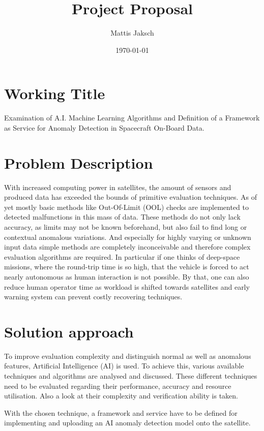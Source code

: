 \documentclass[10pt,a4paper]{scrartcl}
\title{Project Proposal}
\author{Mattis Jaksch}
\date{\today}
\begin{document}
\maketitle

\flushleft

\section*{Working Title}
Examination of A.I. Machine Learning Algorithms and Definition of a Framework as Service for Anomaly Detection in Spacecraft On-Board Data.


\section*{Problem Description}
With increased computing power in satellites, the amount of sensors and produced data has exceeded the bounds of primitive evaluation techniques. As of yet mostly basic methods like Out-Of-Limit (OOL) checks are implemented to detected malfunctions in this mass of data. These methods do not only lack accuracy, as limits may not be known beforehand, but also fail to find long or contextual anomalous variations. And especially for highly varying or unknown input data simple methods are completely inconceivable and therefore complex evaluation algorithms are required. 
In particular if one thinks of deep-space missions, where the round-trip time is so high, that the vehicle is forced to act nearly autonomous as human interaction is not possible. By that, one can also reduce human operator time as workload is shifted towards satellites and early warning system can prevent costly recovering techniques.

\section*{Solution approach}
To improve evaluation complexity and distinguish normal as well as anomalous features, Artificial Intelligence (AI) is used. To achieve this, various available techniques and algorithms \cite{athmos} \cite{aiforspace} are analysed and discussed. These different techniques need to be evaluated regarding their performance, accuracy and resource utilisation. Also a look at their complexity and verification ability is taken.

With the chosen technique, a framework and service have to be defined for implementing and uploading an AI anomaly detection model onto the satellite.
\end{document}
